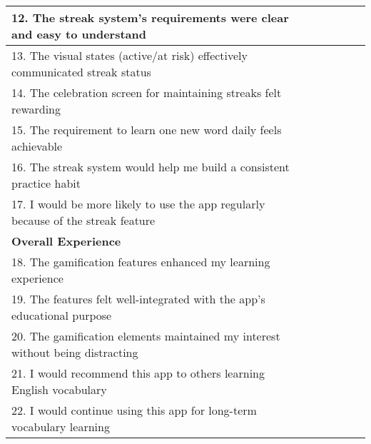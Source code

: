 \begin{table}[h]
{\begin{tabular}{|p{}|c|c|c|c|c|}
            \hline
            12. The streak system's requirements were clear and easy to understand & & & & & \\
            \hline
            13. The visual states (active/at risk) effectively communicated streak status & & & & & \\
            \hline
            14. The celebration screen for maintaining streaks felt rewarding & & & & & \\
            \hline
            15. The requirement to learn one new word daily feels achievable & & & & & \\
            \hline
            16. The streak system would help me build a consistent practice habit & & & & & \\
            \hline
            17. I would be more likely to use the app regularly because of the streak feature & & & & & \\
            \hline
            \multicolumn{6}{|l|}{\textbf{Overall Experience}} \\
            \hline
            18. The gamification features enhanced my learning experience & & & & & \\
            \hline
            19. The features felt well-integrated with the app's educational purpose & & & & & \\
            \hline
            20. The gamification elements maintained my interest without being distracting & & & & & \\
            \hline
            21. I would recommend this app to others learning English vocabulary & & & & & \\
            \hline
            22. I would continue using this app for long-term vocabulary learning & & & & & \\
            \hline
        \end{tabular}
    }
\end{table}